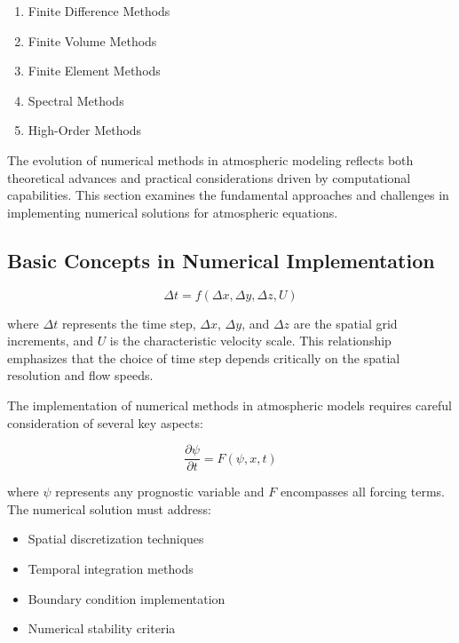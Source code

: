 \documentclass{article}
\begin{document}
\begin{enumerate}
	\item Finite Difference Methods
	\item Finite Volume Methods
	\item Finite Element Methods
	\item Spectral Methods
	\item High-Order Methods
\end{enumerate}

The evolution of numerical methods in atmospheric modeling reflects both theoretical advances and practical considerations driven by computational capabilities. This section examines the fundamental approaches and challenges in implementing numerical solutions for atmospheric equations.

\subsection{Basic Concepts in Numerical Implementation}

\begin{equation}
\Delta t = f(\Delta x, \Delta y, \Delta z, U)
\label{eq:58}
\end{equation}

where $\Delta t$ represents the time step, $\Delta x$, $\Delta y$, and $\Delta z$ are the spatial grid increments, and $U$ is the characteristic velocity scale. This relationship emphasizes that the choice of time step depends critically on the spatial resolution and flow speeds.

The implementation of numerical methods in atmospheric models requires careful consideration of several key aspects:

\begin{equation}
\frac{\partial \psi}{\partial t} = F(\psi, x, t)
\label{eq:59}
\end{equation}

where $\psi$ represents any prognostic variable and $F$ encompasses all forcing terms. The numerical solution must address:

\begin{itemize}
    \item Spatial discretization techniques
    \item Temporal integration methods
    \item Boundary condition implementation
    \item Numerical stability criteria
\end{itemize}
\end{document}

